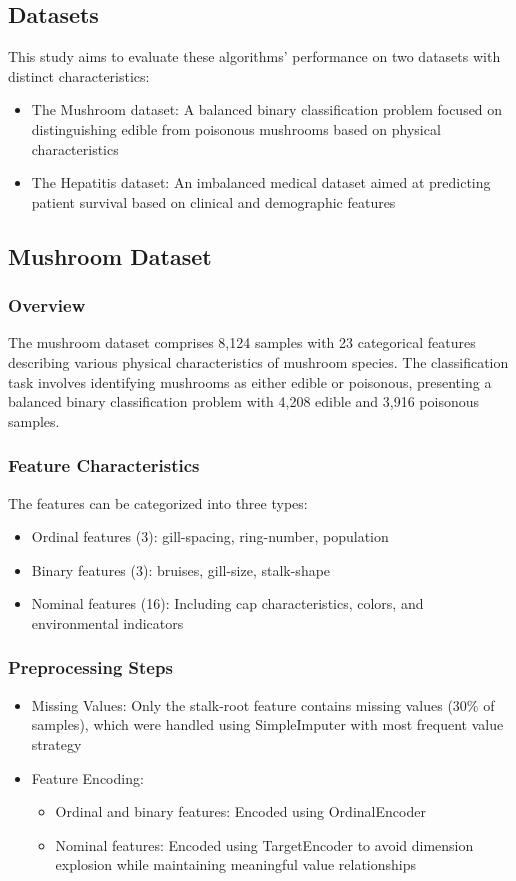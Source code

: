 \subsection{Datasets}

This study aims to evaluate these algorithms' performance on two datasets with distinct characteristics:
\begin{itemize}
	\item The Mushroom dataset: A balanced binary classification problem focused on distinguishing edible from poisonous mushrooms based on physical characteristics
	\item The Hepatitis dataset: An imbalanced medical dataset aimed at predicting patient survival based on clinical and demographic features
\end{itemize}

\subsection{Mushroom Dataset}
\subsubsection{Overview}
The mushroom dataset comprises 8,124 samples with 23 categorical features describing various physical characteristics of mushroom species. The classification task involves identifying mushrooms as either edible or poisonous, presenting a balanced binary classification problem with 4,208 edible and 3,916 poisonous samples.

\subsubsection{Feature Characteristics}
The features can be categorized into three types:
\begin{itemize}
	\item Ordinal features (3): gill-spacing, ring-number, population
	\item Binary features (3): bruises, gill-size, stalk-shape
	\item Nominal features (16): Including cap characteristics, colors, and environmental indicators
\end{itemize}

\subsubsection{Preprocessing Steps}
\begin{itemize}
	\item Missing Values: Only the stalk-root feature contains missing values (30\% of samples), which were handled using SimpleImputer with most frequent value strategy
	\item Feature Encoding:
	\begin{itemize}
		\item Ordinal and binary features: Encoded using OrdinalEncoder
		\item Nominal features: Encoded using TargetEncoder to avoid dimension explosion while maintaining meaningful value relationships
	\end{itemize}
\end{itemize}

